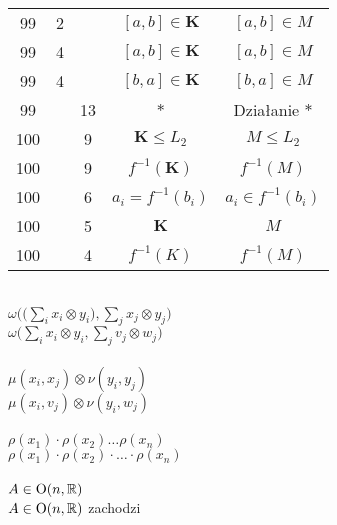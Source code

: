 \documentclass[a4paper,11pt]{article}
\begin{document}
\begin{center}
\begin{tabular}{|c|c|c|c|c|}
    99  &  2 & & $[ a, b ] \in \mathbf{K}$ & $[ a, b ] \in M$ \\
    99  &  4 & & $[ a, b ] \in \mathbf{K}$ & $[ a, b ] \in M$ \\
    99  &  4 & & $[ b, a ] \in \mathbf{K}$ & $[ b, a ] \in M$ \\
    99  & & 13 & $*$ & Działanie $*$ \\
    100 & &  9 & $\mathbf{K} \leq L_{ 2 }$ & $M \leq L_{ 2 }$ \\
    100 & &  9 & $f^{ -1 }( \mathbf{K} )$ & $f^{ - 1}( M )$ \\
    100 & &  6 & $a_{ i } = f^{ -1 }( b_{ i } )$
           & $a_{ i } \in f^{ -1 }( b_{ i } )$ \\
    100 & &  5 & $\mathbf{K}$ & $M$ \\
    100 & &  4 & $f^{ -1 }( K )$ & $f^{ -1 }( M )$ \\
    \hline
  \end{tabular}

\end{center}


\noindent
{} \\
\Jest  $\displaystyle \omega\Big( \big( \sum_{ i } x_{ i } \otimes y_{ i } ),
\sum_{ j } x_{ j } \otimes y_{ j } )$ \\
\Powin $\displaystyle \omega\Big( \sum_{ i } x_{ i } \otimes y_{ i },
\sum_{ j } v_{ j } \otimes w_{ j } \Big)$ \\
 \\
\Jest  $\displaystyle \mu( x_{ i }, x_{ j } ) \otimes \nu( y_{ i }, y_{ j } )$ \\
\Powin $\displaystyle \mu( x_{ i }, v_{ j } ) \otimes \nu( y_{ i }, w_{ j } )$ \\
 \\
\Jest  $\rho( x_{ 1 } ) \cdot \rho( x_{ 2 } ) \ldots \rho( x_{ n } )$ \\
\Powin $\rho( x_{ 1 } ) \cdot \rho( x_{ 2 } ) \cdot \ldots \cdot \rho( x_{ n } )$ \\
 \\
\Jest  $A \in \mathrm{O}( n, \mathbb{R} )$ \\
\Powin $A \in \mathrm{O}( n, \mathbb{R} )$ zachodzi \\
\end{document}
